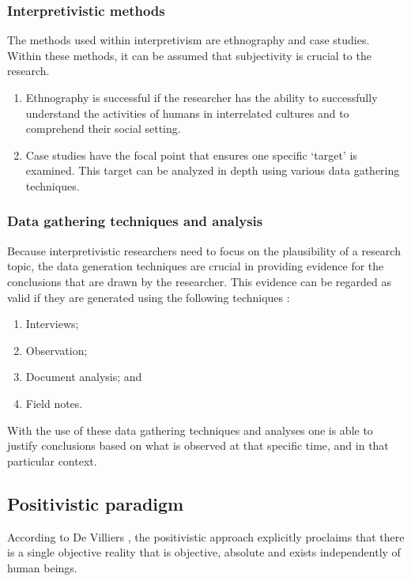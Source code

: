 \subsubsection{Interpretivistic methods}
The methods used within interpretivism are ethnography and case studies. Within these methods, it can be assumed that subjectivity is crucial to the research. 
\begin{enumerate}[label=\roman*.]
	\item Ethnography is successful if the researcher has the ability to successfully understand the activities of humans in interrelated cultures and to comprehend their social setting.
	\item Case studies have the focal point that ensures one specific ‘target’ is examined. This target can be analyzed in depth using various data gathering techniques.
\end{enumerate}

\subsubsection{Data gathering techniques and analysis}
Because interpretivistic researchers need to focus on the plausibility of a research topic, the data generation techniques are crucial in providing evidence for the conclusions that are drawn by the researcher. This evidence can be regarded as valid if they are generated using the following techniques \cite{OatesJ2006}:
\begin{enumerate}[label=\roman*.]
	\item Interviews;
	\item Observation;
	\item Document analysis; and
	\item Field notes.
\end{enumerate}

With the use of these data gathering techniques and analyses one is able to justify conclusions based on what is observed at that specific time, and in that particular context.

\subsection{Positivistic paradigm}
According to De Villiers \cite{DeVilliers2005}, the positivistic approach explicitly proclaims that there is a single objective reality that is objective, absolute and exists independently of human beings. 

